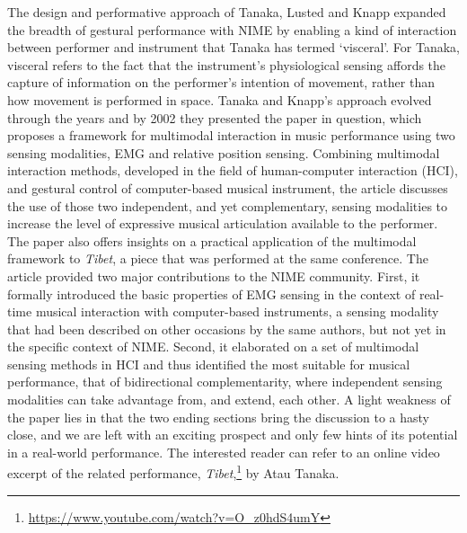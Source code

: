 The design and performative approach of Tanaka, Lusted and Knapp expanded the breadth of gestural performance with NIME by enabling a kind of interaction between performer and instrument that Tanaka has termed \lq visceral\rq \cite{Tanaka:2011}. For Tanaka, visceral refers to the fact that the instrument's physiological sensing affords the capture of information on the performer's intention of movement, rather than how movement is performed in space. Tanaka and Knapp's approach evolved through the years and by 2002 they presented the paper in question, which proposes a framework for multimodal interaction in music performance using two sensing modalities, EMG and relative position sensing. Combining multimodal interaction methods, developed in the field of human-computer interaction (HCI), and gestural control of computer-based musical instrument,  the article discusses the use of those two independent, and yet complementary, sensing modalities to increase the level of expressive musical articulation available to the performer. The paper also offers insights on a practical application of the multimodal framework to \textit{Tibet}, a piece that was performed at the same conference. The article provided two major contributions to the NIME community. First, it formally introduced the basic properties of EMG sensing in the context of real-time musical interaction with computer-based instruments, a sensing modality that had been described on other occasions by the same authors, but not yet in the specific context of NIME. Second, it elaborated on a set of multimodal sensing methods in HCI and thus identified the most suitable for musical performance, that of bidirectional complementarity, where independent sensing modalities can take advantage from, and extend, each other. A light weakness of the paper lies in that the two ending sections bring the discussion to a hasty close, and we are left with an exciting prospect and only few hints of its potential in a real-world performance. The interested reader can refer to an online video excerpt of the related performance, \textit{Tibet},\footnote{\url{https://www.youtube.com/watch?v=O_z0hdS4umY}} by Atau Tanaka.

